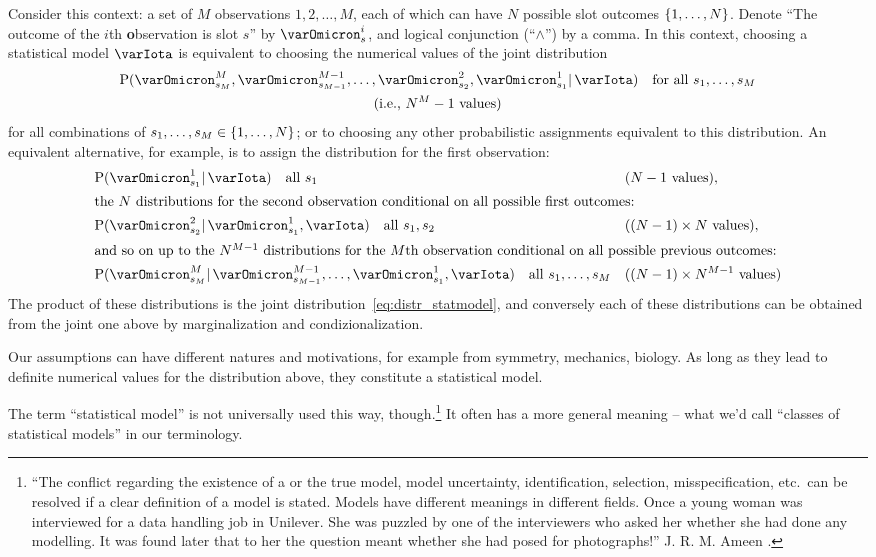 \documentclass[\ifafour a4paper,12pt,\else a5paper,10pt,\fi%
onecolumn,oneside,article,%
british%
]{memoir}
\theoremstyle{remark}
\theoremstyle{innote}
\newcommand*{\citep}{\parencites}
\DeclarePairedDelimiter\set{\{}{\}}
\newcommand*{\p}{\mathrm{P}}%
\renewcommand*{\|}{\mathpunct{|}}
\newcommand*{\ie}{{i.e.}}
\newcommand*{\yI}{\varIota}
\newcommand*{\yO}{\varOmicron}
\begin{document}
Consider this context: a set of $M$ observations $1,2,\dotsc,M$, each of
which can have $N$ possible slot outcomes $\set{1,\dotsc,N}$. Denote
\enquote{The outcome of the $i$th \textbf{o}bservation is slot $s$} by
$\yO^i_s$, and logical conjunction (\enquote{$\land$}) by a comma.
In this context, choosing a statistical model $\yI$ is equivalent to
choosing the numerical values of the joint distribution
\begin{multline}
  \label{eq:distr_statmodel}
  \p( \yO^M_{s_M}, \yO^{M-1}_{s_{M-1}}, \dotsc,
  \yO^2_{s_2}, \yO^1_{s_1} \|  \yI)
  \quad\text{for all $s_1,\dotsc,s_M$}\\\text{(\ie, $N^M-1$ values)}
\end{multline}
for all combinations of $s_1,\dotsc,s_M \in \set{1,\dotsc,N}$; or to
choosing any other probabilistic assignments equivalent to this
distribution. An equivalent alternative, for example, is to assign the
distribution for the first observation:
\begin{subequations}
  \begin{align}
    &\p(\yO^1_{s_1} \|\yI)
    \quad\text{all $s_1$} &&\text{($N-1$ values)},
\\\intertext{the $N$ distributions for the second
  observation conditional on all possible first outcomes:}
    &\p(\yO^2_{s_2} \|\yO^1_{s_1}, \yI)
    \quad\text{all $s_1,s_2$} &&\text{($(N-1)\times N$ values)},
    \\
    \intertext{and so on up to the
  $N^{M-1}$ distributions for the $M$th observation conditional on all
  possible previous outcomes:}
&\p(\yO^M_{s_M} \|
\yO^{M-1}_{s_{M-1}},\dotsc,\yO^1_{s_1},\yI)
\quad\text{all $s_1,\dotsc,s_M$} &&\text{($(N-1)\times N^{M-1}$ values)}
  \end{align}
\end{subequations}
The product of these distributions is the joint
distribution~\eqref{eq:distr_statmodel}, and conversely each of these
distributions can be obtained from the joint one above by marginalization
and condizionalization.

Our assumptions can have different natures and motivations, for example
from symmetry, mechanics, biology. As long as they lead to definite
numerical values for the distribution above, they constitute a statistical
model.

The term \enquote{statistical model} is not universally used this way,
though.\footnote{\enquote{The conflict regarding the existence of a or the
    true model, model uncertainty, identification, selection,
    misspecification, etc.\ can be resolved if a clear definition of a
    model is stated. Models have different meanings in different fields.
    Once a young woman was interviewed for a data handling job in Unilever.
    She was puzzled by one of the interviewers who asked her whether she
    had done any modelling. It was found later that to her the question
    meant whether she had posed for photographs!} J. R. M. Ameen
  \citep[p.~453]{copasetal1995}.} It often has a more general meaning --
what we'd call \enquote{classes of statistical models} in our terminology.
\end{document}
